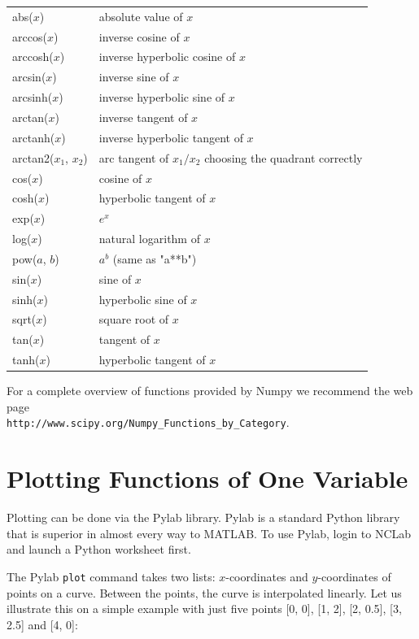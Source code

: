 \documentclass[article,A4,12pt]{llncs}
\begin{document}
\begin{center}
\begin{tabular}{|l|l|}
\hline
abs($x$) &  absolute value of $x$\\
arccos($x$) &  inverse cosine of $x$ \\
arccosh($x$) &  inverse hyperbolic cosine of $x$ \\
arcsin($x$) & inverse sine of $x$ \\
arcsinh($x$) & inverse hyperbolic sine of $x$ \\
arctan($x$) & inverse tangent of $x$ \\
arctanh($x$) & inverse hyperbolic tangent of $x$ \\
arctan2($x_1$, $x_2$) & arc tangent of $x_1/x_2$ choosing the quadrant correctly \\
cos($x$) & cosine of $x$ \\
cosh($x$) & hyperbolic tangent of $x$ \\
exp($x$) & $e^x$ \\
log($x$) & natural logarithm of $x$ \\
pow($a$, $b$) & $a^b$ (same as "a**b")\\
sin($x$) & sine of $x$ \\
sinh($x$) & hyperbolic sine of $x$ \\
sqrt($x$) & square root of $x$ \\
tan($x$) & tangent of $x$\\
tanh($x$) & hyperbolic tangent of $x$ \\
\hline
\end{tabular}
\end{center}
\vspace{4mm}
\noindent
For a complete overview of functions provided by Numpy we recommend the 
web page \\ {\tt http://www.scipy.org/Numpy\_Functions\_by\_Category}.


\section{Plotting Functions of One Variable}\label{plotting}

Plotting can be done via the Pylab library. Pylab is a standard Python library that is 
superior in almost every way to MATLAB. To use Pylab, login to NCLab and launch a Python 
worksheet first.

The Pylab {\tt plot} command takes two
lists: $x$-coordinates and $y$-coordinates of points on a curve. Between the 
points, the curve is interpolated linearly. Let us illustrate this on a simple 
example with just five points [0, 0], [1, 2], [2, 0.5], [3, 2.5] and [4, 0]:
\end{document}
